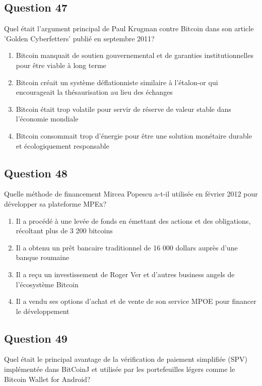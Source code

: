 \documentclass[12pt,a4paper]{article}
\begin{document}
\bigskip


\subsection*{Question 47}
Quel était l'argument principal de Paul Krugman contre Bitcoin dans son article 'Golden Cyberfetters' publié en septembre 2011?

\begin{enumerate}[label=\Alph*., leftmargin=*]
\item Bitcoin manquait de soutien gouvernemental et de garanties institutionnelles pour être viable à long terme
\item Bitcoin créait un système déflationniste similaire à l'étalon-or qui encourageait la thésaurisation au lieu des échanges
\item Bitcoin était trop volatile pour servir de réserve de valeur stable dans l'économie mondiale
\item Bitcoin consommait trop d'énergie pour être une solution monétaire durable et écologiquement responsable
\end{enumerate}

\bigskip


\subsection*{Question 48}
Quelle méthode de financement Mircea Popescu a-t-il utilisée en février 2012 pour développer sa plateforme MPEx?

\begin{enumerate}[label=\Alph*., leftmargin=*]
\item Il a procédé à une levée de fonds en émettant des actions et des obligations, récoltant plus de 3 200 bitcoins
\item Il a obtenu un prêt bancaire traditionnel de 16 000 dollars auprès d'une banque roumaine
\item Il a reçu un investissement de Roger Ver et d'autres business angels de l'écosystème Bitcoin
\item Il a vendu ses options d'achat et de vente de son service MPOE pour financer le développement
\end{enumerate}

\bigskip


\subsection*{Question 49}
Quel était le principal avantage de la vérification de paiement simplifiée (SPV) implémentée dans BitCoinJ et utilisée par les portefeuilles légers comme le Bitcoin Wallet for Android?
\end{document}
